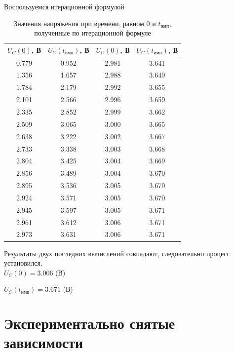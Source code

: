 	Воспользуемся итерационной формулой
\begin{table}[H]

	\begin{center}
	\caption{Значения напряжения при времени, равном $0$ и $t_\text{имп}$, полученные по итерационной формуле}
	\begin{tabular}{|c|c||c|c|}
		\hline 
		$U_C(0)$, В & $U_C(t_\text{имп})$, В & $U_C(0)$, В & $U_C(t_\text{имп})$, В\\ 
		\hline 
		0.779 & 0.952 & 2.981 & 3.641 \\ 
		\hline 
		1.356 & 1.657 & 2.988 & 3.649 \\ 
		\hline 
		1.784 & 2.179 & 2.992 & 3.655 \\
		\hline 
		2.101 & 2.566 & 2.996 & 3.659 \\
		\hline 
		2.335 & 2.852 & 2.999 & 3.662 \\ 
		\hline 
		2.509 & 3.065 & 3.000 & 3.665 \\
		\hline 
		2.638 & 3.222 & 3.002 & 3.667 \\
		\hline 
		2.733 & 3.338 & 3.003 & 3.668 \\ 
		\hline 
		2.804 & 3.425 & 3.004 & 3.669 \\
		\hline 
		2.856 & 3.489 & 3.004 & 3.670 \\
		\hline 
		2.895 & 3.536 & 3.005 & 3.670 \\ 
		\hline 
		2.924 & 3.571 & 3.005 & 3.670 \\ 
		\hline 
		2.945 & 3.597 & 3.005 & 3.671 \\ 
		\hline 
		2.961 & 3.612 & 3.006 & 3.671 \\ 
		\hline 
		2.973 & 3.631 & 3.006 & 3.671 \\ 
		\hline 
		\end{tabular}  	
		
	\end{center}
\end{table}
	Результаты двух последних вычислений совпадают, следовательно процесс установился.\\
	
	$U_C(0) = 3.006$ (В)
	
	$U_C(t_\text{имп}) = 3.671$ (В)

\section{Экспериментально снятые зависимости}

